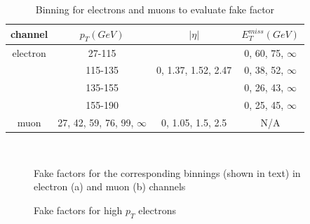 \begin{table}[h]
  \caption{Binning for electrons and muons to evaluate fake factor} \label{tab:FFBinning}
\begin{center}

\begin{tabular}{ | c | c | c | c |}
    \hline
    channel  & $p_{T}(GeV)$ & $|\eta|$ & $E_{T}^{miss}(GeV)$ \\ \hline
    electron & 27-115 &  & 0, 60, 75, $\infty$ \\
             & 115-135&0, 1.37, 1.52, 2.47 & 0, 38, 52, $\infty$ \\
             & 135-155& & 0, 26, 43, $\infty$ \\
             & 155-190& & 0, 25, 45, $\infty$ \\ \hline
    muon     & 27, 42, 59, 76, 99, $\infty$ & 0, 1.05, 1.5, 2.5 & N/A \\ \hline

\end{tabular}
\end{center}
\end{table}

\begin{figure}[ht]
       \centering
        \\
       \caption{Fake factors for the corresponding binnings (shown in text) in electron (a) and muon (b) channels}
       \label{fig:fakefactor}
\end{figure}

\begin{figure}[ht]
       \centering
       \caption{Fake factors for high $p_T$ electrons}
       \label{fig:fakefactor_el_highPt}
\end{figure}



